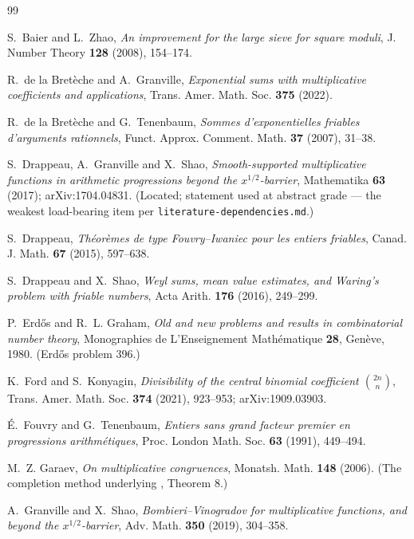 \begin{thebibliography}{99}
\itemsep2pt

 S.~Baier and L.~Zhao,
\emph{An improvement for the large sieve for square moduli},
J. Number Theory \textbf{128} (2008), 154--174.

 R.~de la Bret\`eche and A.~Granville,
\emph{Exponential sums with multiplicative coefficients and applications},
Trans. Amer. Math. Soc. \textbf{375} (2022).

 R.~de la Bret\`eche and G.~Tenenbaum,
\emph{Sommes d'exponentielles friables d'arguments rationnels},
Funct. Approx. Comment. Math. \textbf{37} (2007), 31--38.

 S.~Drappeau, A.~Granville and X.~Shao,
\emph{Smooth-supported multiplicative functions in arithmetic
progressions beyond the $x^{1/2}$-barrier}, Mathematika \textbf{63}
(2017); arXiv:1704.04831. (Located; statement used at abstract grade
--- the weakest load-bearing item per \texttt{literature-dependencies.md}.)

 S.~Drappeau,
\emph{Th\'eor\`emes de type Fouvry--Iwaniec pour les entiers friables},
Canad. J. Math. \textbf{67} (2015), 597--638.

 S.~Drappeau and X.~Shao,
\emph{Weyl sums, mean value estimates, and Waring's problem with friable
numbers}, Acta Arith. \textbf{176} (2016), 249--299.

 P.~Erd\H{o}s and R.~L. Graham,
\emph{Old and new problems and results in combinatorial number theory},
Monographies de L'Enseignement Math\'ematique \textbf{28}, Gen\`eve, 1980.
(Erd\H{o}s problem 396.)

 K.~Ford and S.~Konyagin,
\emph{Divisibility of the central binomial coefficient $\binom{2n}{n}$},
Trans. Amer. Math. Soc. \textbf{374} (2021), 923--953;
arXiv:1909.03903.

 \'E.~Fouvry and G.~Tenenbaum,
\emph{Entiers sans grand facteur premier en progressions arithm\'etiques},
Proc. London Math. Soc. \textbf{63} (1991), 449--494.

 M.~Z. Garaev,
\emph{On multiplicative congruences},
Monatsh. Math. \textbf{148} (2006). (The completion method underlying
\cite{Shp11}, Theorem 8.)

 A.~Granville and X.~Shao,
\emph{Bombieri--Vinogradov for multiplicative functions, and beyond the
$x^{1/2}$-barrier}, Adv. Math. \textbf{350} (2019), 304--358.


\end{thebibliography}
